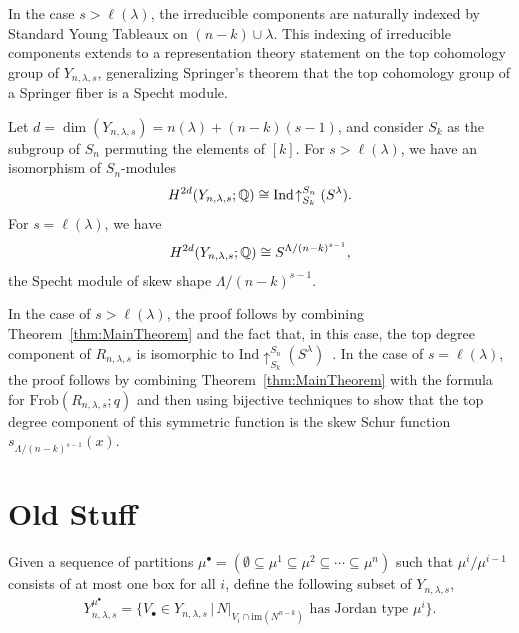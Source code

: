 \documentclass[12pt]{amsart}
\newcommand{\st}{\,|\,}
\newcommand{\Frob}{\mathrm{Frob}}
\newcommand{\la}{\lambda}
\newcommand{\im}{\mathrm{im}}
\begin{document}
In the case $s>\ell(\la)$, the irreducible components are naturally indexed by Standard Young Tableaux on $(n-k) \cup \la$.  This indexing of irreducible components extends to a representation theory statement on the top cohomology group of $Y_{n,\lambda,s}$, generalizing Springer's theorem that the top cohomology group of a Springer fiber is a Specht module.
 

\begin{theorem}
Let $d = \dim(Y_{n,\la,s}) = n(\la) + (n-k)(s-1)$, and consider $S_k$ as the subgroup of $S_n$ permuting the elements of $[k]$. For $s>\ell(\la)$, we have an isomorphism of $S_n$-modules
\begin{align}
H^{2d}(Y_{n,\la,s};\bQ) \cong \mathrm{Ind}\!\uparrow_{S_k}^{S_n} (S^\la).
\end{align}
For $s=\ell(\la)$, we have
\begin{align}\label{eq:SLengthLambdaIso}
    H^{2d}(Y_{n,\la,s};\bQ) \cong S^{\Lambda/(n-k)^{s-1}},
\end{align}
the Specht module of skew shape $\Lambda/(n-k)^{s-1}$.
\end{theorem}

In the case of $s>\ell(\la)$, the proof follows by combining Theorem~\ref{thm:MainTheorem} and the fact that, in this case, the top degree component of $R_{n,\lambda,s}$ is isomorphic to $\mathrm{Ind}\!\!\uparrow_{S_k}^{S_n}(S^\lambda)$~\cite[Corollary 3.3.15]{GriffinThesis}. In the case of $s=\ell(\la)$, the proof follows by combining Theorem~\ref{thm:MainTheorem} with the formula \cite[Theorem 5.13]{GriffinOSP} for $\Frob(R_{n,\lambda,s};q)$ and then using bijective techniques to show that the top degree component of this symmetric function is the skew Schur function $s_{\Lambda/(n-k)^{s-1}}(x)$.


\section{Old Stuff}




Given a sequence of partitions $\mu^\bullet = (\emptyset\subseteq \mu^{1}\subseteq \mu^{2}\subseteq \cdots \subseteq \mu^{n})$ such that $\mu^{i}/\mu^{i-1}$ consists of at most one box for all $i$, define the following subset of $Y_{n,\la,s}$,
\begin{align}
Y_{n,\la,s}^{\mu^\bullet} = \{V_\bullet \in Y_{n,\la,s} \st N|_{V_i\cap \im(N^{n-k})}\text{ has Jordan type }\mu^{i}\}.
\end{align}
\end{document}
